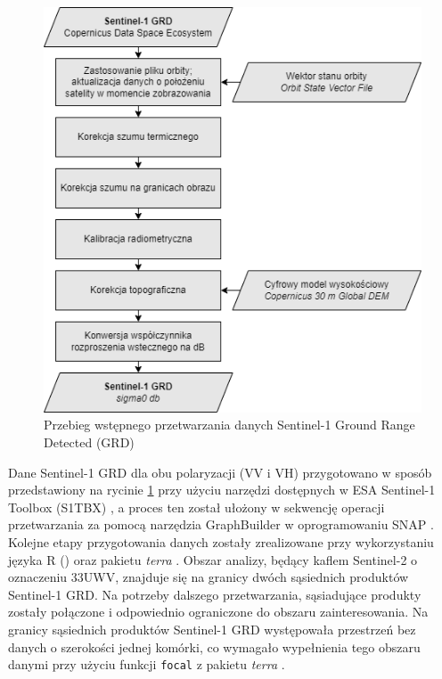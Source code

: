\documentclass{amuthesis}
\begin{document}
\begin{figure}[t]

{\centering \includegraphics[width=4.6875in,height=\textheight]{figures/sentinel1_workflow.drawio.png}

}

\caption{\label{fig-rycina-s1-workflow}Przebieg wstępnego przetwarzania
danych Sentinel-1 Ground Range Detected (GRD)}

\end{figure}

Dane Sentinel-1 GRD dla obu polaryzacji (VV i VH) przygotowano w sposób
przedstawiony na rycinie \ref{fig-rycina-s1-workflow} przy użyciu
narzędzi dostępnych w ESA Sentinel-1 Toolbox (S1TBX) \autocite{s1tbx}, a
proces ten został ułożony w sekwencję operacji przetwarzania za pomocą
narzędzia GraphBuilder w oprogramowaniu SNAP \autocite{snap}. Kolejne
etapy przygotowania danych zostały zrealizowane przy wykorzystaniu
języka R (\textcite{R-base}) oraz pakietu \emph{terra}
\autocite{R-terra}. Obszar analizy, będący kaflem Sentinel-2 o
oznaczeniu 33UWV, znajduje się na granicy dwóch sąsiednich produktów
Sentinel-1 GRD. Na potrzeby dalszego przetwarzania, sąsiadujące produkty
zostały połączone i odpowiednio ograniczone do obszaru zainteresowania.
Na granicy sąsiednich produktów Sentinel-1 GRD występowała przestrzeń
bez danych o szerokości jednej komórki, co wymagało wypełnienia tego
obszaru danymi przy użyciu funkcji \texttt{focal} z pakietu \emph{terra}
\autocite{R-terra}.
\end{document}
